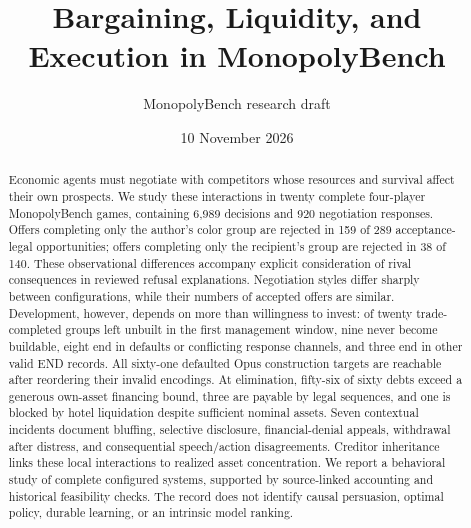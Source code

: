\documentclass[11pt,letterpaper]{article}
\title{Bargaining, Liquidity, and Execution in MonopolyBench}
\author{MonopolyBench research draft}
\date{10 November 2026}
\begin{document}

\maketitle
\begin{abstract}
Economic agents must negotiate with competitors whose resources and survival affect their own prospects. We study these interactions in twenty complete four-player MonopolyBench games, containing 6,989 decisions and 920 negotiation responses. Offers completing only the author's color group are rejected in 159 of 289 acceptance-legal opportunities; offers completing only the recipient's group are rejected in 38 of 140. These observational differences accompany explicit consideration of rival consequences in reviewed refusal explanations. Negotiation styles differ sharply between configurations, while their numbers of accepted offers are similar. Development, however, depends on more than willingness to invest: of twenty trade-completed groups left unbuilt in the first management window, nine never become buildable, eight end in defaults or conflicting response channels, and three end in other valid END records. All sixty-one defaulted Opus construction targets are reachable after reordering their invalid encodings. At elimination, fifty-six of sixty debts exceed a generous own-asset financing bound, three are payable by legal sequences, and one is blocked by hotel liquidation despite sufficient nominal assets. Seven contextual incidents document bluffing, selective disclosure, financial-denial appeals, withdrawal after distress, and consequential speech/action disagreements. Creditor inheritance links these local interactions to realized asset concentration. We report a behavioral study of complete configured systems, supported by source-linked accounting and historical feasibility checks. The record does not identify causal persuasion, optimal policy, durable learning, or an intrinsic model ranking.
\end{abstract}



\begingroup\small

\endgroup
\clearpage\appendix

\end{document}
